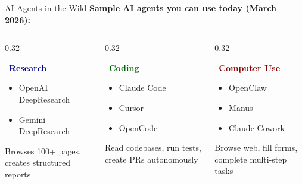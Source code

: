 \documentclass[aspectratio=169,9pt]{beamer}
\begin{document}
\begin{frame}{AI Agents in the Wild}
\textbf{Sample AI agents you can use today (March 2026):}

\vspace{0.3em}
\begin{columns}[T]
\begin{column}{0.32\textwidth}
\begin{bluebox}
\textcolor{darkblue}{\faSearch\ \textbf{Research}}\\[0.3em]
\scriptsize
\begin{itemize}
  \item OpenAI DeepResearch
  \item Gemini DeepResearch
\end{itemize}
\vspace{0.2em}
{\tiny Browses 100+ pages, creates structured reports}
\end{bluebox}
\end{column}

\begin{column}{0.32\textwidth}
\begin{greenbox}
\textcolor{darkgreen}{\faCode\ \textbf{Coding}}\\[0.3em]
\scriptsize
\begin{itemize}
  \item Claude Code
  \item Cursor
  \item OpenCode
\end{itemize}
\vspace{0.2em}
{\tiny Read codebases, run tests, create PRs autonomously}
\end{greenbox}
\end{column}

\begin{column}{0.32\textwidth}
\begin{redbox}
\textcolor{darkred}{\faDesktop\ \textbf{Computer Use}}\\[0.3em]
\scriptsize
\begin{itemize}
  \item OpenClaw
  \item Manus
  \item Claude Cowork
\end{itemize}
\vspace{0.2em}
{\tiny Browse web, fill forms, complete multi-step tasks}
\end{redbox}
\end{column}
\end{columns}


\end{frame}
\end{document}
